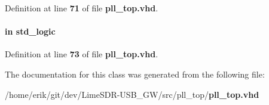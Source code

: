 Definition at line {\bf 71} of file {\bf pll\+\_\+top.\+vhd}.

\paragraph[{txpll\+\_\+smpl\+\_\+cmp\+\_\+error}]{ {\bfseries \textcolor{keywordflow}{in}\textcolor{vhdlchar}{ }} {\bfseries \textcolor{comment}{std\+\_\+logic}\textcolor{vhdlchar}{ }} \hspace{0.3cm}{\ttfamily [Port]}}\label{classpll__top_a619ddab88ca498877253b98321abc3b9}


Definition at line {\bf 73} of file {\bf pll\+\_\+top.\+vhd}.



The documentation for this class was generated from the following file\+:\begin{DoxyCompactItemize}
\item 
/home/erik/git/dev/\+Lime\+S\+D\+R-\/\+U\+S\+B\+\_\+\+G\+W/src/pll\+\_\+top/{\bf pll\+\_\+top.\+vhd}\end{DoxyCompactItemize}
